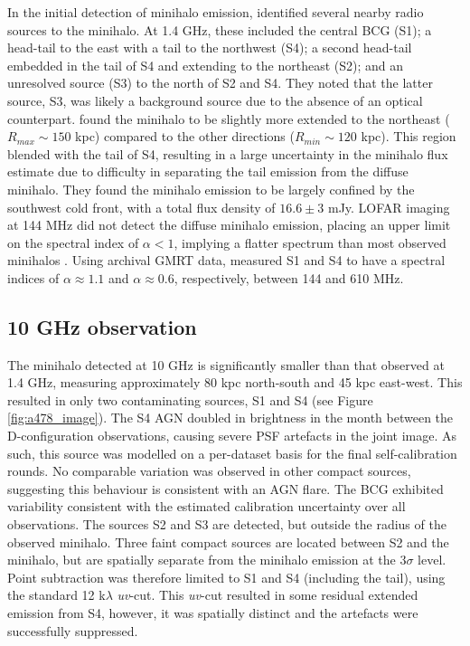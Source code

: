 In the initial detection of minihalo emission, \citet{Giacintucci2014} identified several nearby radio sources to the minihalo. At 1.4 GHz, these included the central BCG (S1); a head-tail to the east with a tail to the northwest (S4); a second head-tail embedded in the tail of S4 and extending to the northeast (S2); and an unresolved source (S3) to the north of S2 and S4. They noted that the latter source, S3, was likely a background source due to the absence of an optical counterpart. \citet{Giacintucci2014} found the minihalo to be slightly more extended to the northeast ($R_{max} \sim 150$ kpc) compared to the other directions ($R_{min}\sim120$ kpc). This region blended with the tail of S4, resulting in a large uncertainty in the minihalo flux estimate due to difficulty in separating the tail emission from the diffuse minihalo. They found the minihalo emission to be largely confined by the southwest cold front, with a total flux density of $16.6\pm3$ mJy. LOFAR imaging at 144 MHz did not detect the diffuse minihalo emission, placing an upper limit on the spectral index of $\alpha < 1$, implying a flatter spectrum than most observed minihalos \citep{Savini2019}. Using archival GMRT data, \citet{Savini2019} measured S1 and S4 to have a spectral indices of $\alpha \approx 1.1$ and $\alpha \approx 0.6$, respectively, between 144 and 610 MHz. 

\subsection{10 GHz observation}
The minihalo detected at 10 GHz is significantly smaller than that observed at 1.4 GHz, measuring approximately 80 kpc north-south and 45 kpc east-west. This resulted in only two contaminating sources, S1 and S4 (see Figure \ref{fig:a478_image}). The S4 AGN doubled in brightness in the month between the D-configuration observations, causing severe PSF artefacts in the joint image. As such, this source was modelled on a per-dataset basis for the final self-calibration rounds. No comparable variation was observed in other compact sources, suggesting this behaviour is consistent with an AGN flare. The BCG exhibited variability consistent with the estimated calibration uncertainty over all observations. The sources S2 and S3 are detected, but outside the radius of the observed minihalo. Three faint compact sources are located between S2 and the minihalo, but are spatially separate from the minihalo emission at the $3\sigma$ level. Point subtraction was therefore limited to S1 and S4 (including the tail), using the standard 12 k$\lambda$ \textit{uv}-cut. This \textit{uv}-cut resulted in some residual extended emission from S4, however, it was spatially distinct and the artefacts were successfully suppressed. 

